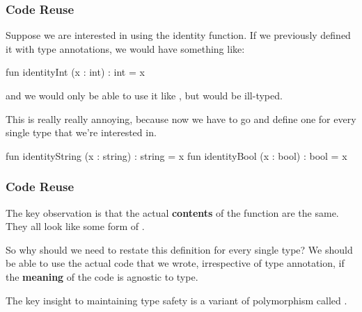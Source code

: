 \documentclass[aspectratio=169, handout]{beamer}
\begin{document}
\begin{frame}[fragile]
  \frametitle{Code Reuse}

  Suppose we are interested in using the identity function. If we previously
  defined it with type annotations, we would have something like:

  \pause
  \vspace{\fill}

  \begin{codeblock}
    fun identityInt (x : int) : int = x
  \end{codeblock}

  and we would only be able to use it like , but 
   would be ill-typed.
  
  \pause
  \vspace{\fill}

  This is really really annoying, because now we have to go and define one for
  every single type that we're interested in.

  \pause
  \begin{codeblock}
    fun identityString (x : string) : string = x
    fun identityBool   (x : bool)   : bool   = x
  \end{codeblock}
\end{frame}

\begin{frame}[fragile]
  \frametitle{Code Reuse}

  The key observation is that the actual \textbf{contents} of the function 
  are the same. They all look like some form of .

  \pause
  \vspace{\fill}

  So why should we need to restate this definition for every single type? We
  should be able to use the actual code that we wrote, irrespective of 
  type annotation, if the \textbf{meaning} of the code is agnostic to type.  

  \pause
  \vspace{\fill}

  The key insight to maintaining type safety is a variant of polymorphism called
  .
\end{frame}
\end{document}
